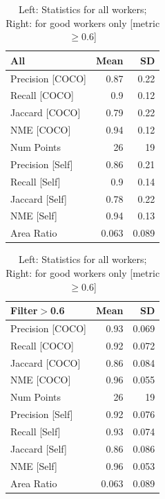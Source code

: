 \documentclass[12pt]{article}
\begin{document}
\begin{table}[h]
\centering

\begin{tabular}{lrr}
\hline
 All              &   Mean &     SD \\
\hline
 Precision [COCO] &  0.87  &  0.22  \\
 Recall [COCO]    &  0.9   &  0.12  \\
 Jaccard [COCO]   &  0.79  &  0.22  \\
 NME [COCO]       &  0.94  &  0.12  \\
 Num Points       & 26     & 19     \\
 Precision [Self] &  0.86  &  0.21  \\
 Recall [Self]    &  0.9   &  0.14  \\
 Jaccard [Self]   &  0.78  &  0.22  \\
 NME [Self]       &  0.94  &  0.13  \\
 Area Ratio       &  0.063 &  0.089 \\
\hline
\end{tabular}
\begin{tabular}{lrr}
\hline
 Filter\ensuremath{>}0.6       &   Mean &     SD \\
\hline
 Precision [COCO] &  0.93  &  0.069 \\
 Recall [COCO]    &  0.92  &  0.072 \\
 Jaccard [COCO]   &  0.86  &  0.084 \\
 NME [COCO]       &  0.96  &  0.055 \\
 Num Points       & 26     & 19     \\
 Precision [Self] &  0.92  &  0.076 \\
 Recall [Self]    &  0.93  &  0.074 \\
 Jaccard [Self]   &  0.86  &  0.086 \\
 NME [Self]       &  0.96  &  0.053 \\
 Area Ratio       &  0.063 &  0.089 \\
\hline
\end{tabular}
\caption{Left: Statistics for all workers; Right: for good workers only [metric$\geq$0.6]}
\label{basic_stat}
\end{table}
\end{document}
